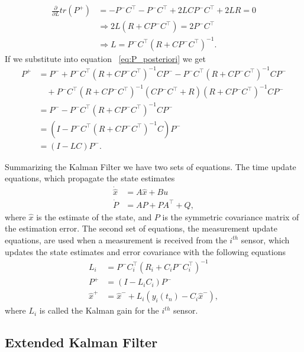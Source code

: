 \begin{align*}
\frac{\partial}{\partial L}tr(P^+)&=-P^-C^\top -P^-C^\top + 2LCP^-C^\top +2LR=0\\
&\Rightarrow 2L(R+CP^-C^\top)=2P^-C^\top \\
&\Rightarrow L = P^-C^\top (R+CP^-C^\top)^{-1}.
\end{align*}
If we substitute into equation ~\ref{eq:P_posteriori} we get
\begin{align*}
P^+&= P^-+P^-C^\top(R+CP^-C^\top)^{-1}CP^- -P^-C^\top(R+CP^-C^\top)^{-1}CP^- \\
   &  \quad +P^-C^\top(R+CP^-C^\top)^{-1}(CP^-C^\top+R)(R+CP^-C^\top)^{-1}CP^- \\
   &= P^- -P^-C^\top(R+CP^-C^\top)^{-1}CP^-\\
   &= (I-P^-C^\top(R+CP^-C^\top)^{-1}C)P^- \\
   &= (I-LC)P^-.
\end{align*}

Summarizing the Kalman Filter we have two sets of equations. The time update equations, which propagate the state estimates
\begin{align}
\dot{\hat{x}}&= A\hat{x}+Bu\\
\dot{P}&= AP+PA^\top+Q,
\end{align}
where \begin{math} \hat{x} \end{math} is the estimate of the state, and \begin{math} P \end{math} is the symmetric covariance matrix of the estimation error. The second set of equations, the measurement update equations, are used when a measurement is received from the \begin{math} i^{th}\end{math} sensor, which updates the state estimates and error covariance with the following equations
\begin{align}
L_i &= P^-C_i^\top(R_i+C_iP^-C_i^\top)^{-1} \\
P^+ &= (I-L_iC_i)P^- \\
\hat{x}^+ &= \hat{x}^- +L_i(y_i(t_n)-C_i\hat{x}^-),
\end{align}
where \begin{math} L_i \end{math} is called the Kalman gain for the \begin{math} i^{th}\end{math} sensor.

\subsection{Extended Kalman Filter}{\label{sub:EKF}}


